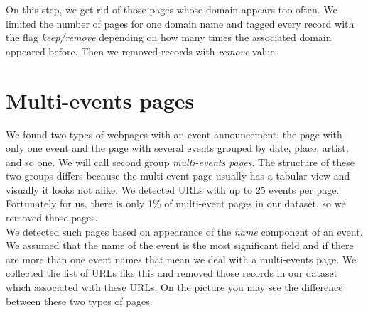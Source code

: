 On this step, we get rid of those pages whose domain appears too often. We limited the number of pages for one domain name and tagged every record with the flag \textit{keep/remove} depending on how many times the associated domain appeared before. Then we removed records with \textit{remove} value.


\section{Multi-events pages}

We found two types of webpages with an event announcement: the page with only one event and the page with several events grouped by date, place, artist, and so one. We will call second group \textit{multi-events pages}. The structure of these two groups differs because the multi-event page usually has a tabular view and visually it looks not alike. We detected URLs with up to 25 events per page. Fortunately for us, there is only 1\% of multi-event pages in our dataset, so we removed those pages. \\

We detected such pages based on appearance of the \textit{name} component of an event. We assumed that the name of the event is the most significant field and if there are more than one event names that mean we deal with a multi-events page. We collected the list of URLs like this and removed those records in our dataset which associated with these URLs.  On the picture  you may see the difference between these two types of pages.  


